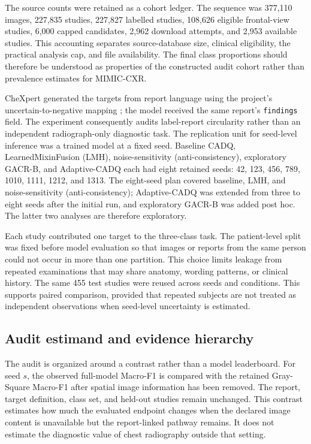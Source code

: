 \documentclass[10pt,a4paper,twocolumn]{article}
\begin{document}
The source counts were retained as a cohort ledger. The sequence was 377,110
images, 227,835 studies, 227,827 labelled studies, 108,626 eligible
frontal-view studies, 6,000 capped candidates, 2,962 download attempts, and
2,953 available studies. This accounting separates source-database size,
clinical eligibility, the practical analysis cap, and file availability. The
final class proportions should therefore be understood as properties of the
constructed audit cohort rather than prevalence estimates for MIMIC-CXR.

CheXpert generated the targets from report language using the project's
uncertain-to-negative mapping \cite{irvin2019chexpert}; the model received the
same report's \texttt{findings} field. The experiment consequently audits
label-report circularity rather than an independent radiograph-only diagnostic
task. The replication unit for seed-level inference was a trained model at a
fixed seed. Baseline CADQ, LearnedMixinFusion (LMH), noise-sensitivity
(anti-consistency), exploratory GACR-B, and Adaptive-CADQ each had eight
retained seeds: 42, 123, 456, 789, 1010, 1111, 1212, and 1313. The eight-seed
plan covered baseline, LMH, and noise-sensitivity (anti-consistency);
Adaptive-CADQ was extended from three to eight seeds after the initial run, and
exploratory GACR-B was added post hoc. The latter two analyses are
therefore exploratory.

Each study contributed one target to the three-class task. The patient-level
split was fixed before model evaluation so that images or reports from the same
person could not occur in more than one partition. This choice limits leakage
from repeated examinations that may share anatomy, wording patterns, or
clinical history. The same 455 test studies were reused across seeds and
conditions. This supports paired comparison, provided that repeated subjects
are not treated as independent observations when seed-level uncertainty is
estimated.

\subsection{Audit estimand and evidence hierarchy}\label{sec:estimand}

The audit is organized around a contrast rather than a model leaderboard. For
seed $s$, the observed full-model Macro-F1 is compared with the retained
Gray-Square Macro-F1 after spatial image information has been removed. The
report, target definition, class set, and held-out studies remain unchanged.
This contrast estimates how much the evaluated endpoint changes when the
declared image content is unavailable but the report-linked pathway remains.
It does not estimate the diagnostic value of chest radiography outside that
setting.
\end{document}
